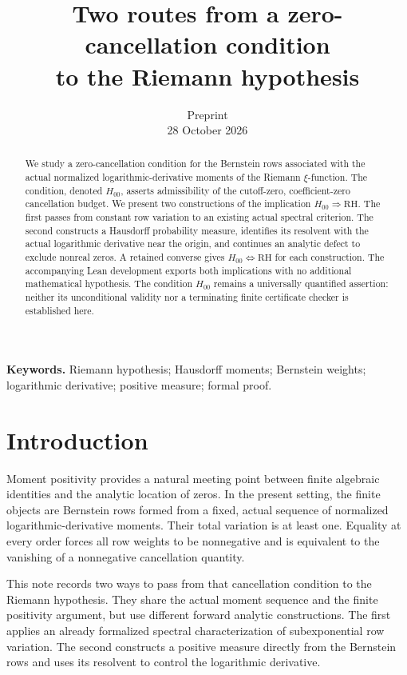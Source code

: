 \documentclass[11pt,a4paper]{article}
\title{\bfseries Two routes from a zero-cancellation condition\\
to the Riemann hypothesis}
\author{}
\date{Preprint\\28 October 2026}
\theoremstyle{definition}
\numberwithin{equation}{section}
\newcommand{\RH}{\mathrm{RH}}
\begin{document}
\maketitle
\vspace{-1.2em}
\begin{abstract}
We study a zero-cancellation condition for the Bernstein rows associated
with the actual normalized logarithmic-derivative moments of the Riemann
$\xi$-function. The condition, denoted $H_{00}$, asserts admissibility of
the cutoff-zero, coefficient-zero cancellation budget. We present two
constructions of the implication $H_{00}\Rightarrow\RH$. The first
passes from constant row variation to an existing actual spectral
criterion. The second constructs a Hausdorff probability measure, identifies
its resolvent with the actual logarithmic derivative near the origin,
and continues an analytic defect to exclude nonreal zeros. A retained
converse gives $H_{00}\Longleftrightarrow\RH$ for each construction.
The accompanying Lean development exports both implications with no
additional mathematical hypothesis. The condition $H_{00}$ remains a
universally quantified assertion: neither its unconditional validity nor
a terminating finite certificate checker is established here.
\end{abstract}
\vspace{0.5em}
\noindent\textbf{Keywords.} Riemann hypothesis; Hausdorff moments; Bernstein
weights; logarithmic derivative; positive measure; formal proof.

\section{Introduction}
Moment positivity provides a natural meeting point between finite
algebraic identities and the analytic location of zeros. In the present
setting, the finite objects are Bernstein rows formed from a fixed,
actual sequence of normalized logarithmic-derivative moments. Their
total variation is at least one. Equality at every order forces all row
weights to be nonnegative and is equivalent to the vanishing of a
nonnegative cancellation quantity.

This note records two ways to pass from that cancellation condition to
the Riemann hypothesis. They share the actual moment sequence and the
finite positivity argument, but use different forward analytic
constructions. The first applies an already formalized spectral
characterization of subexponential row variation. The second constructs
a positive measure directly from the Bernstein rows and uses its
resolvent to control the logarithmic derivative.
\end{document}
